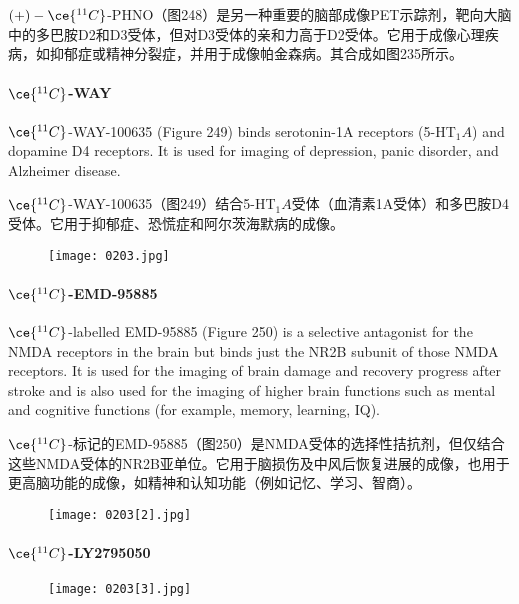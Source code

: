 \documentclass[dvipsnames, svgnames,a4paper,11pt]{article}
\begin{document}
\((+)-\ce{^{11}C}\)-PHNO（图248）是另一种重要的脑部成像PET示踪剂，靶向大脑中的多巴胺D2和D3受体，但对D3受体的亲和力高于D2受体。它用于成像心理疾病，如抑郁症或精神分裂症，并用于成像帕金森病。其合成如图235所示。

\paragraph{\(\ce{^{11}C}\)-WAY}  
\(\ce{^{11}C}\)-WAY-100635 (Figure 249) binds serotonin-1A receptors (5-HT\(_1A\)) and dopamine D4 receptors. It is used for imaging of depression, panic disorder, and Alzheimer disease.

\(\ce{^{11}C}\)-WAY-100635（图249）结合5-HT\(_1A\)受体（血清素1A受体）和多巴胺D4受体。它用于抑郁症、恐慌症和阿尔茨海默病的成像。

\begin{figure}[h]
	\centering
    \texttt{[image: 0203.jpg]}  
     \label{fig249}
\end{figure}

\paragraph{\(\ce{^{11}C}\)-EMD-95885}  
\(\ce{^{11}C}\)-labelled EMD-95885 (Figure 250) is a selective antagonist for the NMDA receptors in the brain but binds just the NR2B subunit of those NMDA receptors. It is used for the imaging of brain damage and recovery progress after stroke and is also used for the imaging of higher brain functions such as mental and cognitive functions (for example, memory, learning, IQ).

\(\ce{^{11}C}\)-标记的EMD-95885（图250）是NMDA受体的选择性拮抗剂，但仅结合这些NMDA受体的NR2B亚单位。它用于脑损伤及中风后恢复进展的成像，也用于更高脑功能的成像，如精神和认知功能（例如记忆、学习、智商）。

\begin{figure}[h]
	\centering
    \texttt{[image: 0203[2].jpg]}  
     \label{fig250}
\end{figure}

\paragraph{\(\ce{^{11}C}\)-LY2795050}  

\begin{wrapfigure}{r}{0.4\textwidth}
    \centering
    \texttt{[image: 0203[3].jpg]}
     \label{fig251}
\end{wrapfigure}
\end{document}
